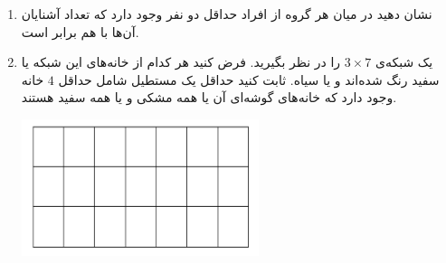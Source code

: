 \EXERCISE
\begin{enumerate}
\item
نشان دهید در میان هر گروه از افراد حداقل دو نفر وجود دارد که تعداد آشنایان آن‌ها با هم برابر است.
\item
یک شبکه‌ی
$3 \times 7$
را در نظر بگیرید. فرض کنید هر کدام از خانه‌های این شبکه یا سفید رنگ شده‌اند و یا سیاه. ثابت کنید حداقل یک مستطیل شامل حداقل
$4$
خانه وجود دارد که خانه‌های گوشه‌ای آن یا همه مشکی و یا همه سفید هستند.
\begin{center}
\includegraphics[height=4cm]{29.png}
\end{center}

\end{enumerate}